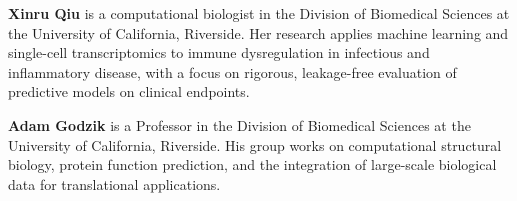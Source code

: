 \documentclass[11pt,a4paper]{article}
\begin{document}
\noindent\textbf{Xinru Qiu} is a computational biologist in the Division of
Biomedical Sciences at the University of California, Riverside. Her research
applies machine learning and single-cell transcriptomics to immune dysregulation
in infectious and inflammatory disease, with a focus on rigorous, leakage-free
evaluation of predictive models on clinical endpoints.

\noindent\textbf{Adam Godzik} is a Professor in the Division of Biomedical
Sciences at the University of California, Riverside. His group works on
computational structural biology, protein function prediction, and the
integration of large-scale biological data for translational applications.

\end{document}
